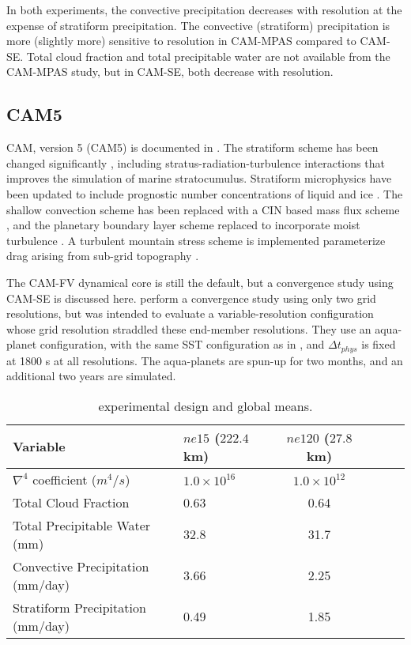 In both experiments, the convective precipitation decreases with resolution at the expense of stratiform precipitation. The convective (stratiform) precipitation is more (slightly more) sensitive to resolution in CAM-MPAS compared to CAM-SE. Total cloud fraction and total precipitable water are not available from the CAM-MPAS study, but in CAM-SE, both decrease with resolution.

\subsection{CAM5}

CAM, version 5 (CAM5) is documented in \citep{CAM5}. The stratiform scheme has been changed significantly \citep{PETAL2014JCLIM}, including stratus-radiation-turbulence interactions that improves the simulation of marine stratocumulus. Stratiform microphysics have been updated to include prognostic number concentrations of liquid and ice \citep{MG2008JC}. The shallow convection scheme has been replaced with a CIN based mass flux scheme \citep{PB2009JC}, and the planetary boundary layer scheme replaced to incorporate moist turbulence \citep{BC2009JCLIM}. A turbulent mountain stress scheme is implemented parameterize drag arising from sub-grid topography \citep{CAM5}.

The CAM-FV dynamical core is still the default, but a convergence study using CAM-SE is discussed here. \cite{ZetAl2014JCb} perform a convergence study using only two grid resolutions, but was intended to evaluate a variable-resolution configuration whose grid resolution straddled these end-member resolutions. They use an aqua-planet configuration, with the same SST configuration as in \cite{W2008TELLUS} \citep[`CONTROL' in][]{NH2000ASL}, and $\Delta t_{phys}$ is fixed at 1800 s at all resolutions. The aqua-planets are spun-up for two months, and an additional two years are simulated.

 \begin{table}
 \caption{\cite{ZetAl2014JCb} experimental design and global means.}
 \centering
 \scriptsize
 \begin{tabular}{llcccc}
 \hline
Variable & $ne15$ ($222.4$ km) & $ne120$ ($27.8$ km)\\
 \hline
   $\nabla^{4}$ coefficient ($m^4/s$) & $1.0 \times 10^{16}$ & $1.0 \times 10^{12}$ \\
   Total Cloud Fraction & 0.63 & 0.64 \\
   Total Precipitable Water (mm) & 32.8 & 31.7 \\
   Convective Precipitation (mm/day) & 3.66 & 2.25 \\
   Stratiform Precipitation (mm/day) & 0.49 & 1.85 \\
 \hline
 \end{tabular}
 \label{tbl:table1-5}
 \end{table}

